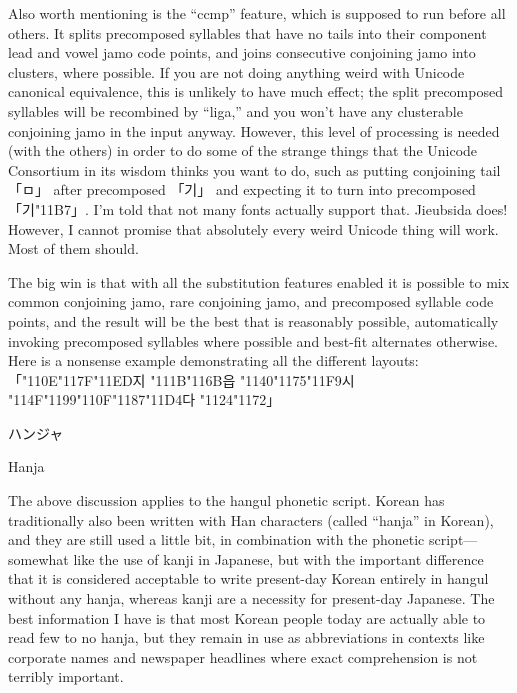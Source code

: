 \documentclass[14pt]{extarticle}
\newcommand{\blsubsection}[2]{%
\kaku\large#1\qquad\phantomsection%
\addcontentsline{toc}{subsection}{#1 #2}%
#2\par\addpenalty{-300}\normalsize}
\begin{document}
Also worth mentioning is the ``ccmp'' feature, which is supposed to run
before all others.  It splits precomposed syllables that have no tails into
their component lead and vowel jamo code points, and joins consecutive
conjoining jamo into clusters, where possible.  If you are not doing
anything weird with Unicode canonical equivalence, this is unlikely to have
much effect; the split precomposed syllables will be recombined by ``liga,''
and you won't have any clusterable conjoining jamo in the input anyway. 
However, this level of processing is needed (with the others) in order to do
some of the strange things that the Unicode Consortium in its wisdom
thinks you want to do, such as putting conjoining tail {\dodum 「ㅁ」} after
precomposed {\dodum 「기」} and expecting it to turn into precomposed
{\dodum 「기\char"11B7」}.  I'm told that not many fonts actually support
that.  Jieubsida does!  However, I cannot promise that absolutely every
weird Unicode thing will work.  Most of them should.

The big win is that with all the substitution
features enabled it is possible to mix common conjoining jamo,
rare conjoining jamo, and precomposed syllable code points, and the result
will be the best that is reasonably possible, automatically invoking
precomposed syllables where possible and best-fit alternates otherwise. 
Here is a nonsense example demonstrating all the different layouts:
{\dodum%
「\char"110E\char"117F\char"11ED지%
\char"111B\char"116B읍%
\char"1140\char"1175\char"11F9시%
\char"114F\char"1199\char"110F\char"1187\char"11D4다%
\char"1124\char"1172」}


\blsubsection{ハンジャ}{Hanja}

The above discussion applies to the hangul phonetic script.  Korean has
traditionally also been written with Han characters (called ``hanja'' in
Korean), and they are still used a little bit, in combination with the
phonetic script---somewhat like the use of kanji in Japanese, but with the
important difference that it is considered acceptable to write present-day
Korean entirely in hangul without any hanja, whereas kanji are a necessity
for present-day Japanese.  The best information I have is that most Korean
people today are actually able to read few to no hanja, but they remain in
use as abbreviations in contexts like corporate names and newspaper
headlines where exact comprehension is not terribly important.
\end{document}

